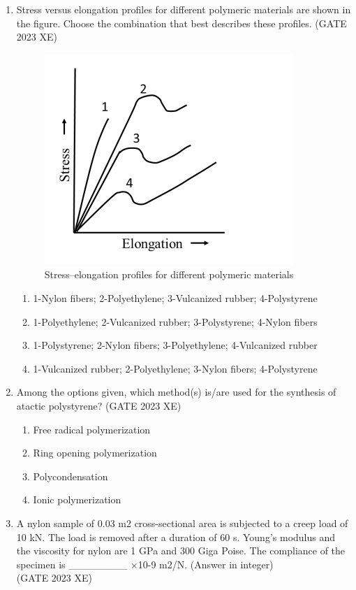 \documentclass[journal,12pt,onecolumn]{IEEEtran}
\begin{document}
\begin{enumerate}
\item Stress versus elongation profiles for different polymeric materials are shown in the figure. Choose the combination that best describes these profiles.
\hfill{(GATE 2023 XE)}

\begin{figure}[htbp]
\centering
\includegraphics[width=0.4\columnwidth]{figs/E/fig3.png}
\caption{Stress–elongation profiles for different polymeric materials}
\label{fig:figs/E/fig3.png}
\end{figure}

\begin{multicols}{2}
\begin{enumerate}
\item 1-Nylon fibers; 2-Polyethylene; 3-Vulcanized rubber; 4-Polystyrene
\item 1-Polyethylene; 2-Vulcanized rubber; 3-Polystyrene; 4-Nylon fibers
\item 1-Polystyrene; 2-Nylon fibers; 3-Polyethylene; 4-Vulcanized rubber
\item 1-Vulcanized rubber; 2-Polyethylene; 3-Nylon fibers; 4-Polystyrene
\end{enumerate}
\end{multicols}

\item Among the options given, which method(s) is/are used for the synthesis of atactic polystyrene?
\hfill{(GATE 2023 XE)}

\begin{multicols}{2}
\begin{enumerate}
\item Free radical polymerization
\item Ring opening polymerization
\item Polycondensation
\item Ionic polymerization
\end{enumerate}
\end{multicols}

\item A nylon sample of 0.03 m2 cross-sectional area is subjected to a creep load of 10 kN. The load is removed after a duration of 60 s. Young’s modulus and the viscosity for nylon are 1 GPa and 300 Giga Poise. The compliance of the specimen is \_\_\_\_\_\_\_\_ ×10-9 m2/N. (Answer in integer)\\
\hfill{(GATE 2023 XE)}\\


\end{enumerate}
\end{document}
